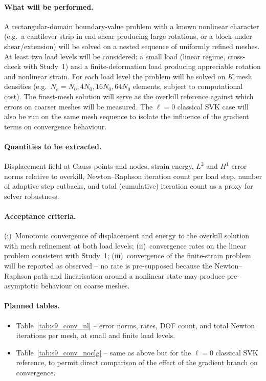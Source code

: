 \documentclass[11pt]{article}
\begin{document}
\paragraph{What will be performed.}
A rectangular-domain boundary-value problem with a known nonlinear
character (e.g.\ a cantilever strip in end shear producing large
rotations, or a block under shear/extension) will be solved on a
nested sequence of uniformly refined meshes.  At least two load
levels will be considered: a small load (linear regime, cross-check
with Study~1) and a finite-deformation load producing appreciable
rotation and nonlinear strain.  For each load level the problem
will be solved on $K$ mesh densities (e.g.\ $N_e = N_{0}, 4N_{0},
16N_{0}, 64N_{0}$ elements, subject to computational cost).  The
finest-mesh solution will serve as the overkill reference against
which errors on coarser meshes will be measured.  The $\ell=0$
classical SVK case will also be run on the same mesh sequence to
isolate the influence of the gradient terms on convergence
behaviour.

\paragraph{Quantities to be extracted.}
Displacement field at Gauss points and nodes, strain energy,
$L^2$ and $H^1$ error norms relative to overkill, Newton--Raphson
iteration count per load step, number of adaptive step cutbacks,
and total (cumulative) iteration count as a proxy for solver
robustness.

\paragraph{Acceptance criteria.}
(i)~Monotonic convergence of displacement and energy to the
overkill solution with mesh refinement at both load levels;
(ii)~convergence rates on the linear problem consistent with
Study~1; (iii)~convergence of the finite-strain problem will
be reported as observed -- no rate is pre-supposed because the
Newton--Raphson path and linearisation around a nonlinear state
may produce pre-asymptotic behaviour on coarse meshes.

\paragraph{Planned tables.}
\begin{itemize}
  \item Table~\ref{tab:s9_conv_nl} -- error norms, rates, DOF
    count, and total Newton iterations per mesh, at small and
    finite load levels.
  \item Table~\ref{tab:s9_conv_noclg} -- same as above but for the
    $\ell=0$ classical SVK reference, to permit direct
    comparison of the effect of the gradient branch on
    convergence.
\end{itemize}
\end{document}
